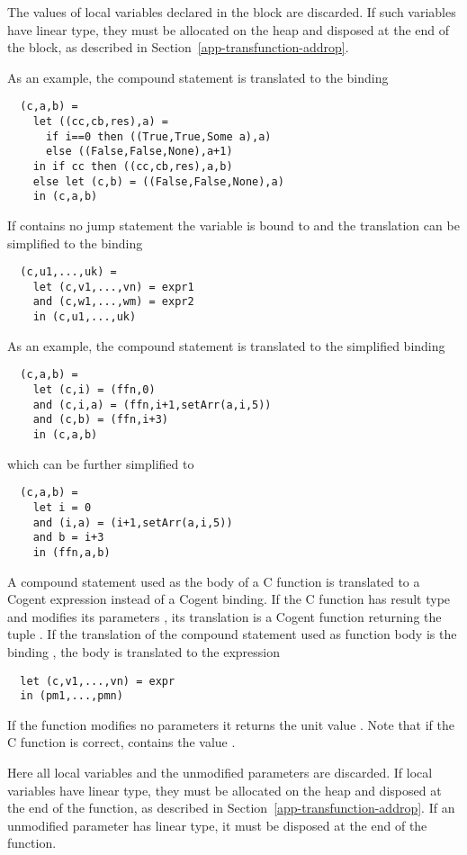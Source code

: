 The values of local variables declared in the block are discarded. If such variables have linear type, they must
be allocated on the heap and disposed at the end of the block, as described in Section~\ref{app-transfunction-addrop}.

As an example, the compound statement  is translated to the binding
\begin{verbatim}
  (c,a,b) =
    let ((cc,cb,res),a) = 
      if i==0 then ((True,True,Some a),a)
      else ((False,False,None),a+1)
    in if cc then ((cc,cb,res),a,b)
    else let (c,b) = ((False,False,None),a)
    in (c,a,b)
\end{verbatim}

If  contains no jump statement the variable  is bound to  and the translation
can be simplified to the binding
\begin{verbatim}
  (c,u1,...,uk) =
    let (c,v1,...,vn) = expr1
    and (c,w1,...,wm) = expr2
    in (c,u1,...,uk)
\end{verbatim}

As an example, the compound statement  is translated to the 
simplified binding
\begin{verbatim}
  (c,a,b) =
    let (c,i) = (ffn,0)
    and (c,i,a) = (ffn,i+1,setArr(a,i,5))
    and (c,b) = (ffn,i+3)
    in (c,a,b)
\end{verbatim}
which can be further simplified to
\begin{verbatim}
  (c,a,b) =
    let i = 0
    and (i,a) = (i+1,setArr(a,i,5))
    and b = i+3
    in (ffn,a,b)
\end{verbatim}

A compound statement used as the body of a C function is translated to a Cogent expression instead of a Cogent binding.
If the C function has result type  and modifies its parameters , its translation is 
a Cogent function returning the tuple . If the translation of the compound statement 
used as function body is the binding , the body is translated to the expression
\begin{verbatim}
  let (c,v1,...,vn) = expr
  in (pm1,...,pmn)
\end{verbatim}
If the function modifies no parameters
it returns the unit value \code{()}. Note that if the C function is correct,  contains the value .

Here all local variables and the unmodified parameters are discarded. If local variables have linear type, they must
be allocated on the heap and disposed at the end of the function, as described in Section~\ref{app-transfunction-addrop}.
If an unmodified parameter has linear type, it must be disposed at the end of the function.

